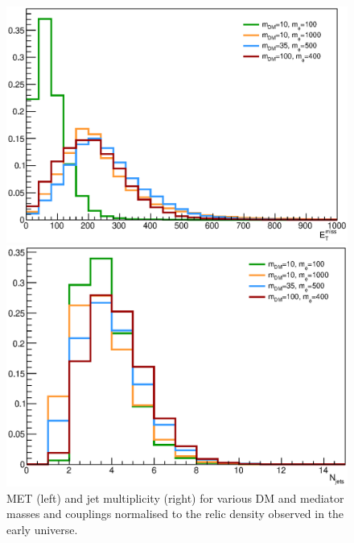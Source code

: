 \begin{figure}[h!]
    \begin{minipage}{0.49\textwidth}
      \centering 
      \includegraphics[scale=0.32]{figures/bFDM/bfdm_relic/missing_et.eps}
    \end{minipage}
    \hfill
    \begin{minipage}{0.49\textwidth}
      \centering 
      \includegraphics[scale=0.32]{figures/bFDM/bfdm_relic/Njets.eps}
    \end{minipage}
    \caption{MET (left) and jet multiplicity (right) for various DM and mediator masses and couplings normalised to the relic density observed in the early universe. \label{fig:relic}}
\end{figure}

